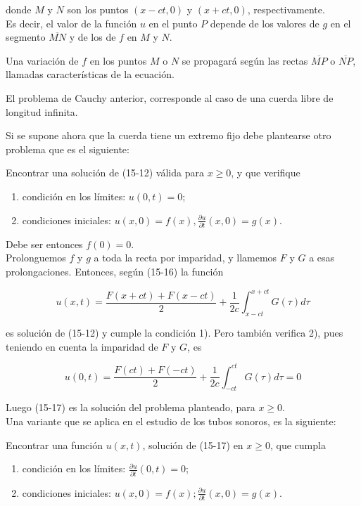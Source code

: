 \documentclass[10pt]{article}
\theoremstyle{plain}
\theoremstyle{definition}
\theoremstyle{remark}
\begin{document}
donde $M$ y $N$ son los puntos $(x-c t, 0)$ y $(x+c t, 0)$, respectivamente.\\
Es decir, el valor de la función $u$ en el punto $P$ depende de los valores de $g$ en el segmento $\overline{M N}$ y de los de $f$ en $M$ y $N$.

Una variación de $f$ en los puntos $M$ o $N$ se propagará según las rectas $\overline{M P}$ o $\overline{N P}$, llamadas características de la ecuación.

El problema de Cauchy anterior, corresponde al caso de una cuerda libre de longitud infinita.

Si se supone ahora que la cuerda tiene un extremo fijo debe plantearse otro problema que es el siguiente:

Encontrar una solución de (15-12) válida para $x \geqslant 0$, y que verifique

\begin{enumerate}
  \item condición en los límites: $u(0, t)=0$;
  \item condiciones iniciales: $u(x, 0)=f(x), \frac{\partial u}{\partial t}(x, 0)=g(x)$.
\end{enumerate}

Debe ser entonces $f(0)=0$.\\
Prolonguemos $f$ y $g$ a toda la recta por imparidad, y llamemos $F$ y $G$ a esas prolongaciones. Entonces, según (15-16) la función


\begin{equation*}
u(x, t)=\frac{F(x+c t)+F(x-c t)}{2}+\frac{1}{2 c} \int_{x-c t}^{x+c t} G(\tau) d \tau \tag{15-17}
\end{equation*}


es solución de (15-12) y cumple la condición 1). Pero también verifica 2), pues teniendo en cuenta la imparidad de $F$ y $G$, es

$$
u(0, t)=\frac{F(c t)+F(-c t)}{2}+\frac{1}{2 c} \int_{-c t}^{c t} G(\tau) d \tau=0
$$

Luego (15-17) es la solución del problema planteado, para $x \geqslant 0$.\\
Una variante que se aplica en el estudio de los tubos sonoros, es la siguiente:

Encontrar una función $u(x, t)$, solución de (15-17) en $x \geqslant 0$, que cumpla


\begin{enumerate}
  \item condición en los límites: $\frac{\partial u}{\partial t}(0, t)=0$;
  \item condiciones iniciales: $u(x, 0)=f(x) ; \frac{\partial u}{\partial t}(x, 0)=g(x)$.
\end{enumerate}
\end{document}
